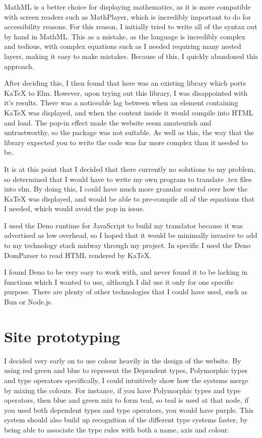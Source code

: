 \documentclass{l4proj}
\begin{document}
MathML is a better choice for displaying mathematics, as it is more compatible with screen readers such as MathPlayer, which is incredibly important to do for accessibility reasons.  For this reason, I initially tried to write all of the syntax out by hand in MathML.  This as a mistake, as the language is incredibly complex and tedious, with complex equations such as I needed requiring many nested layers, making it easy to make mistakes.  Because of this, I quickly abandoned this approach.

After deciding this, I then found that here was an existing library which ports KaTeX to Elm.  However, upon trying out this library, I was disappointed with it's results.  There was a noticeable lag between when an element containing KaTeX was displayed, and when the content inside it would compile into HTML and load.  The pop-in effect made the website seem amateurish and untrustworthy, so the package was not suitable.  As well as this, the way that the library expected you to write the code was far more complex than it needed to be.

It is at this point that I decided that there currently no solutions to my problem, so determined that I would have to write my own program to translate .tex files into elm.  By doing this, I could have much more granular control over how the KaTeX was displayed, and would be able to pre-compile all of the equations that I needed, which would avoid the pop in issue.

I used the Deno runtime for JavaScript to build my translator because it was advertised as low overhead, so I hoped that it would be minimally invasive to add to my technology stack midway through my project.  In specific I used the Deno DomParser to read HTML rendered by KaTeX. 

I found Deno to be very easy to work with, and never found it to be lacking in functions which I wanted to use, although I did use it only for one specific purpose.  There are plenty of other technologies that I could have used, such as Bun or Node.js.

\section{Site prototyping}

I decided very early on to use colour heavily in the design of the website.  By using red green and blue to represent the Dependent types, Polymorphic types and type operators specifically, I could intuitively show how the systems merge by mixing the colours.  For instance, if you have Polymorphic types and type operators, then blue and green mix to form teal, so teal is used at that node, if you used both dependent types and type operators, you would have purple.  This system should also build up recognition of the different type systems faster, by being able to associate the type rules with both a name, axis and colour.
\end{document}
